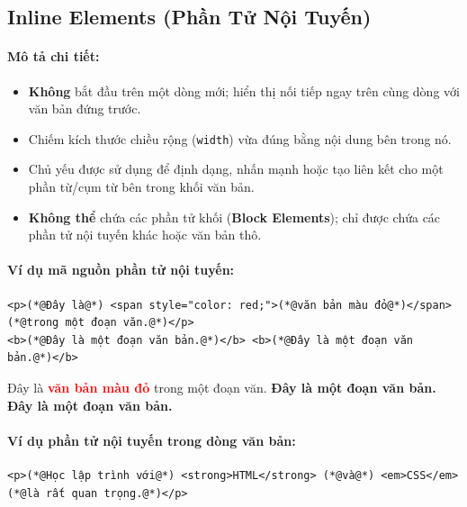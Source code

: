 \documentclass[11pt,oneside]{book}
\newcommand{\codeinline}[1]{\textcolor{accentOrange}{\texttt{#1}}}
\newcommand{\term}[1]{\textbf{\textcolor{primaryBlue}{#1}}}
\begin{document}
\subsection{Inline Elements (Phần Tử Nội Tuyến)}

\paragraph{Mô tả chi tiết:}
\begin{itemize}[leftmargin=1.8em, itemsep=3pt, parsep=0pt]
    \item \textbf{Không} bắt đầu trên một dòng mới; hiển thị nối tiếp ngay trên cùng dòng với văn bản đứng trước.
    \item Chiếm kích thước chiều rộng (\codeinline{width}) vừa đúng bằng nội dung bên trong nó.
    \item Chủ yếu được sử dụng để định dạng, nhấn mạnh hoặc tạo liên kết cho một phần từ/cụm từ bên trong khối văn bản.
    \item \textbf{Không thể} chứa các phần tử khối (\term{Block Elements}); chỉ được chứa các phần tử nội tuyến khác hoặc văn bản thô.
\end{itemize}

\paragraph{Ví dụ mã nguồn phần tử nội tuyến:}
\begin{codeWindow}
\begin{lstlisting}[language=HTML5]
<p>(*@Đây là@*) <span style="color: red;">(*@văn bản màu đỏ@*)</span> (*@trong một đoạn văn.@*)</p>
<b>(*@Đây là một đoạn văn bản.@*)</b> <b>(*@Đây là một đoạn văn bản.@*)</b>
\end{lstlisting}
\end{codeWindow}

\begin{browserWindow}
\sffamily\small
Đây là \textcolor{red}{\textbf{văn bản màu đỏ}} trong một đoạn văn. \textbf{Đây là một đoạn văn bản.} \textbf{Đây là một đoạn văn bản.}
\end{browserWindow}

\paragraph{Ví dụ phần tử nội tuyến trong dòng văn bản:}
\begin{codeWindow}
\begin{lstlisting}[language=HTML5]
<p>(*@Học lập trình với@*) <strong>HTML</strong> (*@và@*) <em>CSS</em> (*@là rất quan trọng.@*)</p>
\end{lstlisting}
\end{codeWindow}
\end{document}
